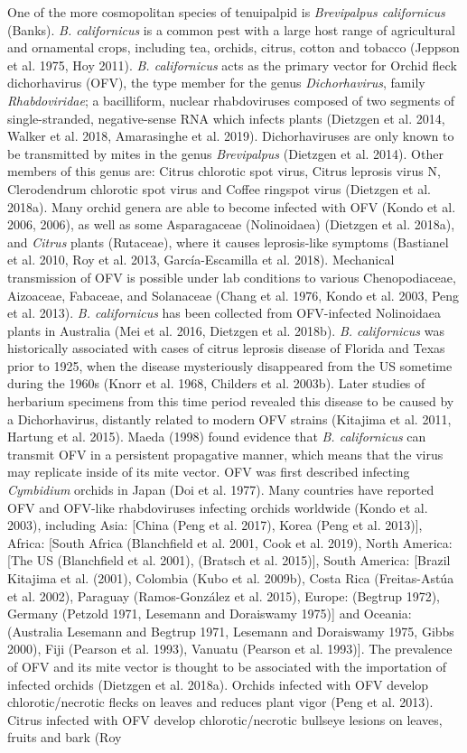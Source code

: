 \documentclass[12pt,final,CPage]{ufthesis}
\begin{document}
{  One of the more cosmopolitan species of tenuipalpid is \emph{Brevipalpus californicus} (Banks). \emph{B. californicus} is a common pest with a large host range of agricultural and ornamental crops, including tea, orchids, citrus, cotton and tobacco (Jeppson et al. 1975, Hoy 2011). \emph{B. californicus} acts as the primary vector for Orchid fleck dichorhavirus (OFV), the type member for the genus \emph{Dichorhavirus}, family \emph{Rhabdoviridae}; a bacilliform, nuclear rhabdoviruses composed of two segments of single-stranded, negative-sense RNA which infects plants (Dietzgen et al. 2014, Walker et al. 2018, Amarasinghe et al. 2019). Dichorhaviruses are only known to be transmitted by mites in the genus \emph{Brevipalpus} (Dietzgen et al. 2014). Other members of this genus are: Citrus chlorotic spot virus, Citrus leprosis virus N, Clerodendrum chlorotic spot virus and Coffee ringspot virus (Dietzgen et al. 2018a). Many orchid genera are able to become infected with OFV (Kondo et al. 2006, 2006), as well as some Asparagaceae (Nolinoidaea) (Dietzgen et al. 2018a), and \emph{Citrus} plants (Rutaceae), where it causes leprosis-like symptoms (Bastianel et al. 2010, Roy et al. 2013, García-Escamilla et al. 2018). Mechanical transmission of OFV is possible under lab conditions to various Chenopodiaceae, Aizoaceae, Fabaceae, and Solanaceae (Chang et al. 1976, Kondo et al. 2003, Peng et al. 2013). \emph{B. californicus} has been collected from OFV-infected Nolinoidaea plants in Australia (Mei et al. 2016, Dietzgen et al. 2018b). \emph{B. californicus} was historically associated with cases of citrus leprosis disease of Florida and Texas prior to 1925, when the disease mysteriously disappeared from the US sometime during the 1960s (Knorr et al. 1968, Childers et al. 2003b). Later studies of herbarium specimens from this time period revealed this disease to be caused by a Dichorhavirus, distantly related to modern OFV strains (Kitajima et al. 2011, Hartung et al. 2015). Maeda (1998) found evidence that \emph{B. californicus} can transmit OFV in a persistent propagative manner, which means that the virus may replicate inside of its mite vector. OFV was first described infecting \emph{Cymbidium} orchids in Japan (Doi et al. 1977). Many countries have reported OFV and OFV-like rhabdoviruses infecting orchids worldwide (Kondo et al. 2003), including Asia: {[}China (Peng et al. 2017), Korea (Peng et al. 2013){]}, Africa: {[}South Africa (Blanchfield et al. 2001, Cook et al. 2019), North America: {[}The US (Blanchfield et al. 2001), (Bratsch et al. 2015){]}, South America: {[}Brazil Kitajima et al. (2001), Colombia (Kubo et al. 2009b), Costa Rica (Freitas-Astúa et al. 2002), Paraguay (Ramos-González et al. 2015), Europe: (Begtrup 1972), Germany (Petzold 1971, Lesemann and Doraiswamy 1975){]} and Oceania: (Australia Lesemann and Begtrup 1971, Lesemann and Doraiswamy 1975, Gibbs 2000), Fiji (Pearson et al. 1993), Vanuatu (Pearson et al. 1993){]}. The prevalence of OFV and its mite vector is thought to be associated with the importation of infected orchids (Dietzgen et al. 2018a). Orchids infected with OFV develop chlorotic/necrotic flecks on leaves and reduces plant vigor (Peng et al. 2013). Citrus infected with OFV develop chlorotic/necrotic bullseye lesions on leaves, fruits and bark (Roy }
\end{document}
